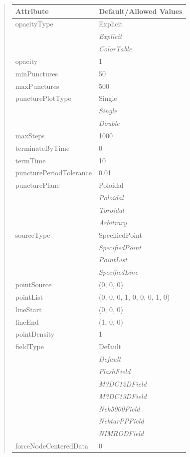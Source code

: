 \documentclass[letterpaper,10pt,english]{sphinxmanual}
\begin{document}
\begin{quote}
\begin{longtable}{|l|l|}
\textbf{Attribute}
 & 
\textbf{Default/Allowed Values}
\\
\hline
opacityType
 & 
Explicit
\\
\hline & 
\emph{Explicit}
\\
\hline & 
\emph{ColorTable}
\\
\hline
opacity
 & 
1
\\
\hline
minPunctures
 & 
50
\\
\hline
maxPunctures
 & 
500
\\
\hline
puncturePlotType
 & 
Single
\\
\hline & 
\emph{Single}
\\
\hline & 
\emph{Double}
\\
\hline
maxSteps
 & 
1000
\\
\hline
terminateByTime
 & 
0
\\
\hline
termTime
 & 
10
\\
\hline
puncturePeriodTolerance
 & 
0.01
\\
\hline
puncturePlane
 & 
Poloidal
\\
\hline & 
\emph{Poloidal}
\\
\hline & 
\emph{Toroidal}
\\
\hline & 
\emph{Arbitrary}
\\
\hline
sourceType
 & 
SpecifiedPoint
\\
\hline & 
\emph{SpecifiedPoint}
\\
\hline & 
\emph{PointList}
\\
\hline & 
\emph{SpecifiedLine}
\\
\hline
pointSource
 & 
(0, 0, 0)
\\
\hline
pointList
 & 
(0, 0, 0, 1, 0, 0, 0, 1, 0)
\\
\hline
lineStart
 & 
(0, 0, 0)
\\
\hline
lineEnd
 & 
(1, 0, 0)
\\
\hline
pointDensity
 & 
1
\\
\hline
fieldType
 & 
Default
\\
\hline & 
\emph{Default}
\\
\hline & 
\emph{FlashField}
\\
\hline & 
\emph{M3DC12DField}
\\
\hline & 
\emph{M3DC13DField}
\\
\hline & 
\emph{Nek5000Field}
\\
\hline & 
\emph{NektarPPField}
\\
\hline & 
\emph{NIMRODField}
\\
\hline
forceNodeCenteredData
 & 
0
\\

\end{longtable}
\end{quote}
\end{document}
